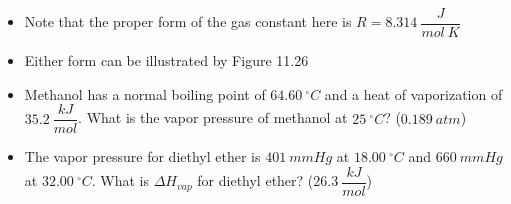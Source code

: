 \documentclass[12pt, openany, letterpaper]{memoir}
\begin{document}
\begin{itemize}
\begin{itemize}
\begin{itemize}
		\end{itemize}
		\item Note that the proper form of the gas constant here is $R=8.314~\dfrac{J}{mol~K}$
		\item Either form can be illustrated by Figure 11.26
		\item Methanol has a normal boiling point of $64.60~^\circ C$ and a heat of vaporization of $35.2~\dfrac{kJ}{mol}$. What is the vapor pressure of methanol at $25~^\circ C$? ($0.189~atm$)
		\item The vapor pressure for diethyl ether is $401~mmHg$ at $18.00~^\circ C$ and $660~mmHg$ at $32.00~^\circ C$. What is $\Delta H_{vap}$ for diethyl ether? ($26.3~\dfrac{kJ}{mol}$)
	\end{itemize}
\end{itemize}
\end{document}
